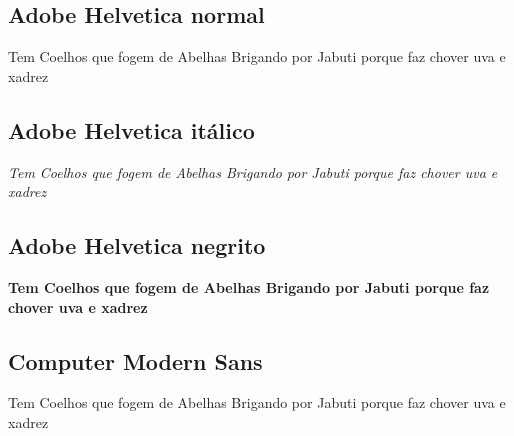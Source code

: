 \documentclass[a4paper]{article}
\newcommand{\frase}{Tem Coelhos que fogem de Abelhas Brigando por Jabuti porque faz chover uva e xadrez}
\begin{document}
\subsection*{Adobe Helvetica normal}
\frase

\subsection*{Adobe Helvetica itálico}
\textit{\frase}

\subsection*{Adobe Helvetica negrito}
\textbf{\frase}

\subsection*{Computer Modern Sans}
{\selectfont
\frase}
\end{document}
